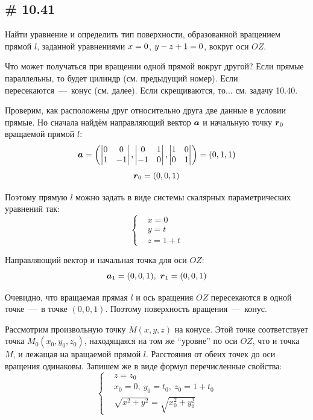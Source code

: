 \documentclass[a4paper,12pt]{article}
\begin{document}
  
  \subsection{\# 10.41}
  
  Найти уравнение и определить тип поверхности, образованной вращением прямой $l$, заданной уравнениями $x \hm= 0$, $y \hm- z \hm+ 1 \hm= 0$, вокруг оси $OZ$.
  
  \begin{solution}
    Что может получаться при вращении одной прямой вокруг другой?
    Если прямые параллельны, то будет цилиндр (см. предыдущий номер).
    Если пересекаются~---~конус (см. далее). %
    Если скрещиваются, то... см. задачу 10.40.
    
    Проверим, как расположены друг относительно друга две данные в условии прямые.
    Но сначала найдём направляющий вектор $\boldsymbol a$ и начальную точку $\boldsymbol r_0$ вращаемой прямой $l$:
    \[
      \boldsymbol a = \left(\begin{vmatrix}0 & 0\\ 1 & -1\end{vmatrix}, \begin{vmatrix}0 & 1\\ -1 & 0\end{vmatrix}, \begin{vmatrix}1 & 0\\ 0 & 1\end{vmatrix}\right)
      = (0, 1, 1)
    \]
    \[
      \boldsymbol r_0 = (0, 0, 1)
    \]
    
    Поэтому прямую $l$ можно задать в виде системы скалярных параметрических уравнений так:
    \[
      \left\{
        \begin{aligned}
          &x = 0\\
          &y = t\\
          &z = 1 + t
        \end{aligned}
      \right.
    \]
    
    Направляющий вектор и начальная точка для оси $OZ$:
    \[
      \boldsymbol a_1 = (0, 0, 1),\ \boldsymbol r_1 = (0, 0, 1)
    \]
    
    Очевидно, что вращаемая прямая $l$ и ось вращения $OZ$ пересекаются в одной точке~---~в точке $(0, 0, 1)$.
    Поэтому поверхность вращения~---~конус.
    
    Рассмотрим произвольную точку $M(x, y, z)$ на конусе.
    Этой точке соответствует точка $M_0(x_0, y_0, z_0)$, находящаяся на том же ``уровне'' по оси $OZ$, что и точка $M$, и лежащая на вращаемой прямой $l$.
    Расстояния от обеих точек до оси вращения одинаковы.
    Запишем же в виде формул перечисленные свойства:
    \[
      \left\{
        \begin{aligned}
          &z = z_0\\
          &x_0 = 0,\ y_0 = t_0,\ z_0 = 1 + t_0\\
          &\sqrt{x^2 + y^2} = \sqrt{x_0^2 + y_0^2}
        \end{aligned}
      \right.
    \]
    

\end{solution}
\end{document}
